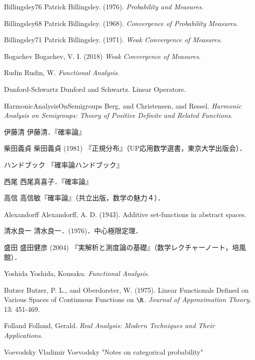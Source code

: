 \documentclass[uplatex,dvipdfmx]{jsreport}
\begin{document}

\begin{thebibliography}{99}
    \item{Billingsley76}
    Patrick Billingsley. (1976). \textit{Probability and Measures}.
    \item{Billingsley68}
    Patrick Billingsley. (1968). \textit{Convergence of Probability Measures}.
    \item{Billingsley71}
    Patrick Billingsley. (1971). \textit{Weak Convergence of Measures}.
    \item{Bogachev}
    Bogachev, V. I. (2018) \textit{Weak Convergence of Measures}.
    \item{Rudin}
    Rudin, W. \textit{Functional Analysis}.
    \item{Dunford-Schwartz}
    Dunford and Schwartz. Linear Operators.
    \item{HarmonicAnalysisOnSemigroups}
    Berg, and Christensen, and Ressel. \textit{Harmonic Analysis on Semigroups: Theory of Positive Definite and Related Functions}.

    \item{伊藤清}
    伊藤清．『確率論』
    \item{柴田義貞}
    柴田義貞 (1981) 『正規分布』（UP応用数学選書，東京大学出版会）．
    \item{ハンドブック}
    『確率論ハンドブック』
    \item{西尾}
    西尾真喜子．『確率論』
    \item{高信}
    高信敏『確率論』（共立出版，数学の魅力４）．
    \item{Alexandorff}
    Alexandorff, A. D. (1943). Additive set-functions in abstract spaces.
    \item{清水良一}
    清水良一．(1976)．中心極限定理．
    \item{盛田}
    盛田健彦 (2004) 『実解析と測度論の基礎』（数学レクチャーノート，培風館）．
    \item{Yoshida}
    Yoshida, Kousaku. \textit{Functional Analysis}.
    \item{Butzer}
    Butzer, P. L., and Oberdorster, W. (1975). Linear Functionals Defined on Various Spaces of Continuous Functions on $\R$. \textit{Journal of Approximation Theory}. 13: 451-469.
    \item{Folland}
    Folland, Gerald. \textit{Real Analysis: Modern Techniques and Their Applications}.

    \item{Voevodsky}
    Vladimir Voevodsky "Notes on categorical probability"




\end{thebibliography}
\end{document}
